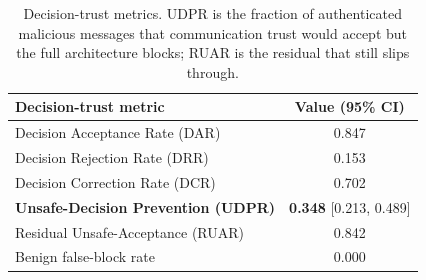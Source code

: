 \begin{table}[t]
\centering
\caption{Decision-trust metrics. UDPR is the fraction of authenticated malicious messages that communication trust would accept but the full architecture blocks; RUAR is the residual that still slips through.}
\label{tab:decisiontrust}
\begin{tabular}{lc}
\toprule
Decision-trust metric & Value (95\% CI) \\
\midrule
Decision Acceptance Rate (DAR) & 0.847 \\
Decision Rejection Rate (DRR) & 0.153 \\
Decision Correction Rate (DCR) & 0.702 \\
\textbf{Unsafe-Decision Prevention (UDPR)} & \textbf{0.348} [0.213, 0.489] \\
Residual Unsafe-Acceptance (RUAR) & 0.842 \\
Benign false-block rate & 0.000 \\
\bottomrule
\end{tabular}
\end{table}
